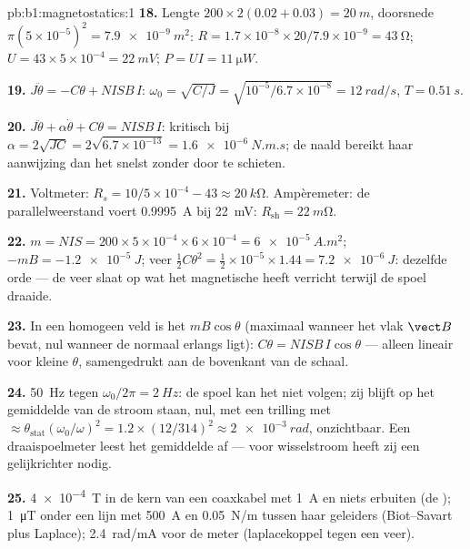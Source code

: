 \begin{solution}{pb:b1:magnetostatics:1}
\textbf{18.} Lengte $200 \times 2(0.02 + 0.03) = \qty{20}{m}$, doorsnede $\pi(5 \times
10^{-5})^2 = \qty{7.9e-9}{m^2}$: $R = 1.7 \times 10^{-8} \times 20/7.9 \times 10^{-9} =
\qty{43}{\ohm}$; $U = 43 \times 5 \times 10^{-4} = \qty{22}{mV}$; $P = UI = \qty{11}{\micro W}$.

\textbf{19.} $J\ddot\theta = -C\theta + NISB\,I$: $\omega_0 = \sqrt{C/J} = \sqrt{10^{-5}/6.7
\times 10^{-8}} = \qty{12}{rad/s}$, $T = \qty{0.51}{s}$.

\textbf{20.} $J\ddot\theta + \alpha\dot\theta + C\theta = NISB\,I$: kritisch bij
$\alpha = 2\sqrt{JC} = 2\sqrt{6.7 \times 10^{-13}} = \qty{1.6e-6}{N.m.s}$; de naald
bereikt haar aanwijzing dan het snelst zonder door te schieten.

\textbf{21.} Voltmeter: $R_s = 10/5 \times 10^{-4} - 43 \approx \qty{20}{k\ohm}$.
Ampèremeter: de parallelweerstand voert \qty{0.9995}{A} bij \qty{22}{mV}: $R_{\text{sh}} =
\qty{22}{m\ohm}$.

\textbf{22.} $m = NIS = 200 \times 5 \times 10^{-4} \times 6 \times 10^{-4} = \qty{6e-5}{A.m^2}$;
$-mB = \qty{-1.2e-5}{J}$; veer $\tfrac12C\theta^2 = \tfrac12 \times 10^{-5} \times 1.44 =
\qty{7.2e-6}{J}$: dezelfde orde --- de veer slaat op wat het magnetische
 heeft verricht terwijl de spoel draaide.

\textbf{23.} In een homogeen veld is het  $mB\cos\theta$ (maximaal wanneer
het vlak $\vect B$ bevat, nul wanneer de normaal erlangs ligt): $C\theta =
NISB\,I\cos\theta$ --- alleen lineair voor kleine $\theta$, samengedrukt aan de
bovenkant van de schaal.

\textbf{24.} \qty{50}{Hz} tegen $\omega_0/2\pi = \qty{2}{Hz}$: de spoel kan het niet
volgen; zij blijft op het gemiddelde van de stroom staan, nul, met een trilling met
 $\approx \theta_{\text{stat}}(\omega_0/\omega)^2 = 1.2 \times (12/314)^2 \approx
\qty{2e-3}{rad}$, onzichtbaar. Een draaispoelmeter leest het gemiddelde af --- voor
wisselstroom heeft zij een gelijkrichter nodig.

\textbf{25.} \qty{4e-4}{T} in de kern van een coaxkabel met \qty{1}{A} en niets erbuiten
(de ); \qty{1}{\micro T} onder een lijn met \qty{500}{A} en \qty{0.05}{N/m}
tussen haar geleiders (Biot--Savart plus Laplace); \qty{2.4}{rad/mA} voor
de meter (laplacekoppel tegen een veer).
\end{solution}
